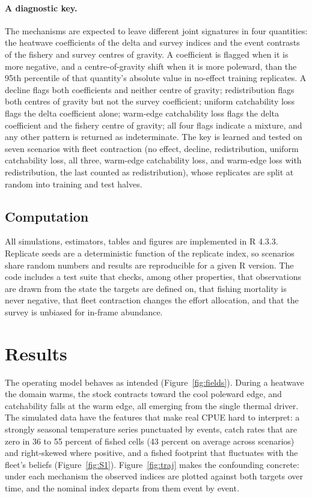 \documentclass[11pt,a4paper]{article}
\begin{document}
\paragraph{A diagnostic key.} The mechanisms are expected to leave different joint signatures in four quantities: the heatwave coefficients of the delta and survey indices and the event contrasts of the fishery and survey centres of gravity. A coefficient is flagged when it is more negative, and a centre-of-gravity shift when it is more poleward, than the 95th percentile of that quantity's absolute value in no-effect training replicates. A decline flags both coefficients and neither centre of gravity; redistribution flags both centres of gravity but not the survey coefficient; uniform catchability loss flags the delta coefficient alone; warm-edge catchability loss flags the delta coefficient and the fishery centre of gravity; all four flags indicate a mixture, and any other pattern is returned as indeterminate. The key is learned and tested on seven scenarios with fleet contraction (no effect, decline, redistribution, uniform catchability loss, all three, warm-edge catchability loss, and warm-edge loss with redistribution, the last counted as redistribution), whose replicates are split at random into training and test halves.

\subsection{Computation}

All simulations, estimators, tables and figures are implemented in R 4.3.3. Replicate seeds are a deterministic function of the replicate index, so scenarios share random numbers and results are reproducible for a given R version. The code includes a test suite that checks, among other properties, that observations are drawn from the state the targets are defined on, that fishing mortality is never negative, that fleet contraction changes the effort allocation, and that the survey is unbiased for in-frame abundance.

\section{Results}

The operating model behaves as intended (Figure~\ref{fig:fields}). During a heatwave the domain warms, the stock contracts toward the cool poleward edge, and catchability falls at the warm edge, all emerging from the single thermal driver. The simulated data have the features that make real CPUE hard to interpret: a strongly seasonal temperature series punctuated by events, catch rates that are zero in 36 to 55 percent of fished cells (43 percent on average across scenarios) and right-skewed where positive, and a fished footprint that fluctuates with the fleet's beliefs (Figure~\ref{fig:S1}). Figure~\ref{fig:traj} makes the confounding concrete: under each mechanism the observed indices are plotted against both targets over time, and the nominal index departs from them event by event.
\end{document}
